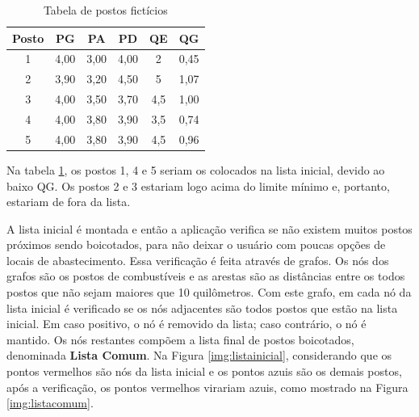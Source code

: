\begin{table}[H]
\centering
\caption{Tabela de postos fictícios}
\label{tab:exemplo}
\begin{tabular}{|c|c|c|c|c|c|}\hline
\textbf{Posto} & \textbf{PG}   & \textbf{PA}   & \textbf{PD}   & \textbf{QE}  & \textbf{QG}   \\
\hline
1     & 4,00 & 3,00 & 4,00 & 2   & 0,45 \\ \hline
2     & 3,90 & 3,20 & 4,50 & 5   & 1,07 \\ \hline
3     & 4,00 & 3,50 & 3,70 & 4,5 & 1,00 \\ \hline
4     & 4,00 & 3,80 & 3,90 & 3,5 & 0,74 \\ \hline
5     & 4,00 & 3,80 & 3,90 & 4,5 & 0,96 \\ \hline
\end{tabular}
\end{table}

Na tabela \ref{tab:exemplo}, os postos 1, 4 e 5 seriam os colocados na lista inicial, devido ao baixo QG. Os postos 2 e 3 estariam logo acima do limite mínimo e, portanto, estariam de fora da lista.

A lista inicial é montada e então a aplicação verifica se não existem muitos postos próximos sendo boicotados, para não deixar o usuário com poucas opções de locais de abastecimento. Essa verificação é feita através de grafos. Os nós dos grafos são os postos de combustíveis e as arestas são as distâncias entre os todos postos que não sejam maiores que 10 quilômetros. Com este grafo, em cada nó da lista inicial é verificado se os nós adjacentes são todos postos que estão na lista inicial. Em caso positivo, o nó é removido da lista; caso contrário, o nó é mantido. Os nós restantes compõem a lista final de postos boicotados, denominada \textbf{Lista Comum}. Na Figura \ref{img:listainicial}, considerando que os pontos vermelhos são nós da lista inicial e os pontos azuis são os demais postos, após a verificação, os pontos vermelhos virariam azuis, como mostrado na Figura \ref{img:listacomum}.

